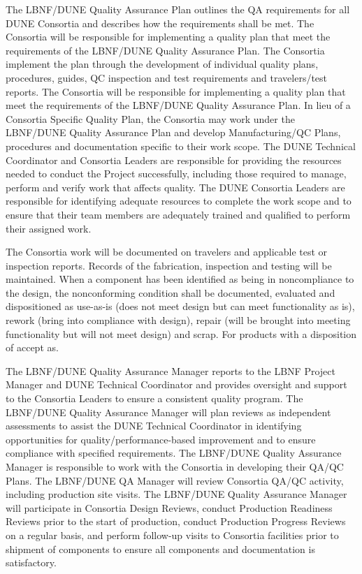The LBNF/DUNE Quality Assurance Plan outlines the QA requirements for
all DUNE Consortia and describes how the requirements shall be
met. The Consortia will be responsible for implementing a quality plan
that meet the requirements of the LBNF/DUNE Quality Assurance Plan.
The Consortia implement the plan through the development of individual
quality plans, procedures, guides, QC inspection and test requirements
and travelers/test reports.  The Consortia will be responsible for
implementing a quality plan that meet the requirements of the
LBNF/DUNE Quality Assurance Plan. In lieu of a Consortia Specific
Quality Plan, the Consortia may work under the LBNF/DUNE Quality
Assurance Plan and develop Manufacturing/QC Plans, procedures and
documentation specific to their work scope.  The DUNE Technical
Coordinator and Consortia Leaders are responsible for providing the
resources needed to conduct the Project successfully, including those
required to manage, perform and verify work that affects quality.  The
DUNE Consortia Leaders are responsible for identifying adequate
resources to complete the work scope and to ensure that their team
members are adequately trained and qualified to perform their assigned
work.

The Consortia work will be documented on travelers and applicable test
or inspection reports. Records of the fabrication, inspection and
testing will be maintained. When a component has been identified as
being in noncompliance to the design, the nonconforming condition
shall be documented, evaluated and dispositioned as use-as-is (does
not meet design but can meet functionality as is), rework (bring into
compliance with design), repair (will be brought into meeting
functionality but will not meet design) and scrap. For products with a
disposition of accept as.

The LBNF/DUNE Quality Assurance Manager reports to the LBNF Project
Manager and DUNE Technical Coordinator and provides oversight and
support to the Consortia Leaders to ensure a consistent quality
program. The LBNF/DUNE Quality Assurance Manager will plan reviews as
independent assessments to assist the DUNE Technical Coordinator in
identifying opportunities for quality/performance-based improvement
and to ensure compliance with specified requirements. The LBNF/DUNE
Quality Assurance Manager is responsible to work with the Consortia in
developing their QA/QC Plans. The LBNF/DUNE QA Manager will review
Consortia QA/QC activity, including production site visits.  The
LBNF/DUNE Quality Assurance Manager will participate in Consortia
Design Reviews, conduct Production Readiness Reviews prior to the
start of production, conduct Production Progress Reviews on a regular
basis, and perform follow-up visits to Consortia facilities prior to
shipment of components to ensure all components and documentation is
satisfactory.


